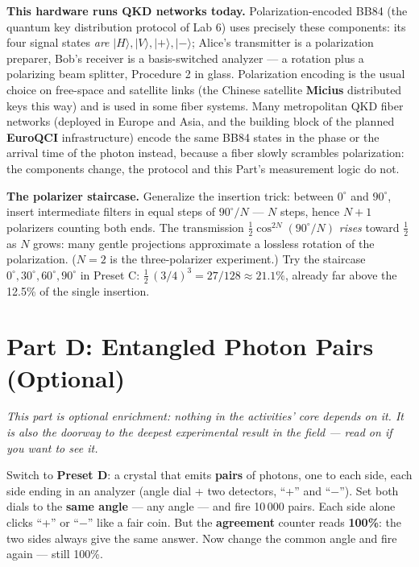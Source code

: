 \documentclass[a4paper,11pt]{article}
\providecommand{\ket}[1]{|#1\rangle}
\begin{document}
\begin{industrybox}
\textbf{This hardware runs QKD networks today.} Polarization-encoded BB84 (the quantum
key distribution protocol of Lab 6) uses precisely these components: its four signal
states \emph{are}
$\ket{H}, \ket{V}, \ket{+}, \ket{-}$; Alice's transmitter is a polarization
preparer, Bob's receiver is a basis-switched analyzer --- a rotation plus a
polarizing beam splitter, Procedure 2 in glass. Polarization encoding is the
usual choice on free-space and satellite links (the Chinese satellite \textbf{Micius}
distributed keys this way) and is used in some fiber systems. Many metropolitan QKD fiber
networks (deployed in Europe and Asia, and the building block of the planned
\textbf{EuroQCI} infrastructure) encode the same BB84 states in the phase or the arrival
time of the photon instead, because a fiber slowly scrambles polarization: the components
change, the protocol and this Part's measurement logic do not.
\end{industrybox}

\begin{deepdivebox}
\textbf{The polarizer staircase.} Generalize the insertion trick: between $0^\circ$
and $90^\circ$, insert intermediate filters in equal steps of $90^\circ/N$ --- $N$
steps, hence $N+1$ polarizers counting both ends. The transmission
$\tfrac12\cos^{2N}(90^\circ/N)$ \emph{rises} toward $\tfrac12$ as $N$ grows: many
gentle projections approximate a lossless rotation of the polarization. ($N = 2$ is
the three-polarizer experiment.) Try the staircase
$0^\circ, 30^\circ, 60^\circ, 90^\circ$ in Preset C:
$\tfrac12\,(3/4)^3 = 27/128 \approx 21.1\%$, already far above the 12.5\% of the
single insertion.
\end{deepdivebox}

\section{Part D: Entangled Photon Pairs \textnormal{\normalsize(Optional)}}

\noindent\textit{This part is optional enrichment: nothing in the activities' core
depends on it. It is also the doorway to the deepest experimental result in the
field --- read on if you want to see it.}

\begin{benchbox}
Switch to \textbf{Preset D}: a crystal that emits \textbf{pairs} of photons, one to
each side, each side ending in an analyzer (angle dial + two detectors, ``+'' and
``$-$''). Set both dials to the \textbf{same angle} --- any angle --- and fire
10\,000 pairs. Each side alone clicks ``+'' or ``$-$'' like a fair coin. But the
\textbf{agreement} counter reads \textbf{100\%}: the two sides always give the same
answer. Now change the common angle and fire again --- still 100\%.
\end{benchbox}
\end{document}
